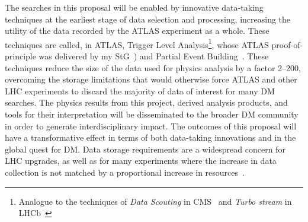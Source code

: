 \documentclass[11pt,a4paper]{article}
\begin{document}
The searches in this proposal will be enabled by innovative data-taking techniques at the earliest stage of data selection and processing, increasing the utility of the data recorded by the ATLAS experiment as a whole. 
These techniques are called, in ATLAS, Trigger Level Analysis\footnote{Analogue to the techniques of \textit{Data Scouting} in CMS~\cite{Khachatryan:2016ecr} and \textit{Turbo stream} in LHCb~\cite{Aaij:2016rxn}}, whose ATLAS proof-of-principle was delivered by my StG~\cite{Aaboud:2018fzt}) and Partial Event Building~\cite{Aaboud:2016leb}.  
These techniques reduce the size of the data used for physics analysis by a factor 2--200, 
overcoming the storage limitations that would otherwise force ATLAS and other LHC experiments to discard the majority of data of interest for many DM searches.
The physics results from this project, derived analysis products, and tools for their interpretation will be disseminated to the broader DM community in order to generate interdisciplinary impact.
The outcomes of this proposal will have a transformative effect in terms of both data-taking innovations and in the global quest for DM. 
Data storage requirements are a widespread concern for LHC upgrades, as well as for many experiments where the increase in data collection is not matched by a proportional increase in resources~\cite{Alves:2017she,Allen:2018yvz}. 
\end{document}
